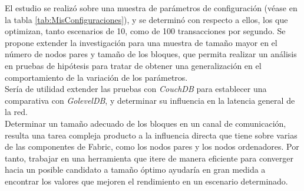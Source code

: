 \begin{recomendations}
El estudio se realiz\'o sobre una muestra de par\'ametros de configuraci\'on (v\'ease en la tabla \ref{tab:MisConfiguraciones}), y se determin\'o con respecto a ellos, los que optimizan, tanto escenarios de 10, como de 100 transacciones por segundo. Se propone extender la investigaci\'on para una muestra de tama\~no mayor en el n\'umero de nodos pares y tama\~no de los bloques, que permita realizar un an\'alisis en pruebas de hip\'otesis para tratar de obtener una generalizaci\'on en el comportamiento de la variaci\'on de los par\'ametros.\\

Ser\'ia de utilidad extender las pruebas con \emph{CouchDB} para establecer una comparativa con \emph{GolevelDB}, y determinar su influencia en la latencia general de la red.\\

Determinar un tama\~no adecuado de los bloques en un canal de comunicaci\'on, resulta una tarea compleja producto a la influencia directa que tiene sobre varias de las componentes de Fabric, como los nodos pares y los nodos ordenadores. Por tanto, trabajar en una herramienta que itere de manera eficiente para converger hacia un posible candidato a tama\~no \'optimo ayudar\'ia en gran medida a encontrar los valores que mejoren el rendimiento en un escenario determinado.
\end{recomendations}
